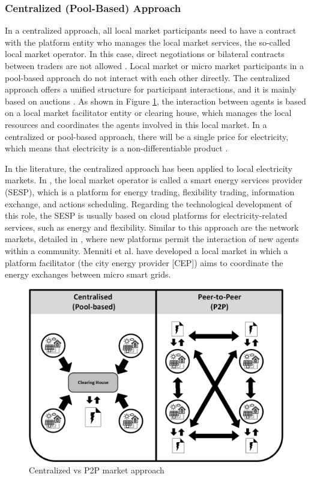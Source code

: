 \subsubsection{Centralized (Pool-Based) Approach}
In a centralized approach, all local market participants need to have a contract with the platform entity who manages the local market services, the so-called local market operator. In this case, direct negotiations or bilateral contracts between traders are not allowed \cite{DesignElectricityMarketRossetoo2017}. Local market or micro market participants in a pool-based approach do not interact with each other directly. The centralized approach offers a unified structure for participant interactions, and it is mainly based on auctions \cite{vytelingum2010trading}. As shown in Figure \ref{fig:POOL_P2P}, the interaction between agents is based on a local market facilitator entity or clearing house, which manages the local resources and coordinates the agents involved in this local market. In a centralized or pool-based approach, there will be a single price for electricity, which means that electricity is a non-differentiable product \cite{Pinson2017}.

In the literature, the centralized approach has been applied to local electricity markets. In \cite{ilieva2016design}, the local market operator is called a smart energy services provider (SESP), which is a platform for energy trading, flexibility trading, information exchange, and actions scheduling. Regarding the technological development of this role, the SESP is usually based on cloud platforms for electricity-related services, such as energy and flexibility. Similar to this approach are the network markets, detailed in \cite{parker2016platform}, where new platforms permit the interaction of new agents within a community. Menniti et al. \cite{menniti2014future} have developed a local market in which a platform facilitator (the city energy provider [CEP]) aims to coordinate the energy exchanges between micro smart grids. 


\begin{figure}[h]
	\centering
	\includegraphics[width=0.7\columnwidth ]{ChapterIntro/Figures/CENTRALISED_P2P.jpg}
		\caption{Centralized vs P2P market approach}
	\label{fig:POOL_P2P}  
\end{figure}

